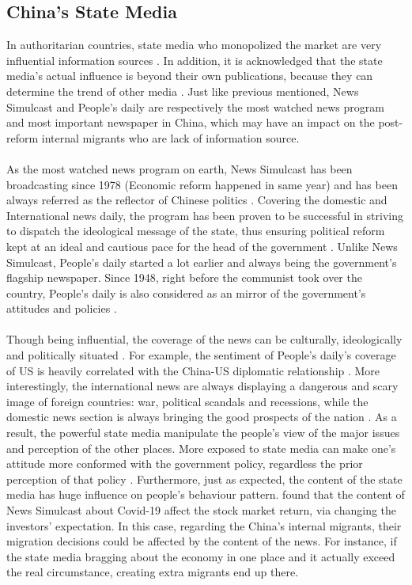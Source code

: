\documentclass{article}
\begin{document}
\subsection{China's State Media}
In authoritarian countries, state media who monopolized the market are very influential information sources \parencite{Becker:2004bl}. In addition, it is acknowledged that the state media's actual influence is beyond their own publications, because they can determine the trend of other media \parencite{Zhang:2022et}. Just like previous mentioned, News Simulcast and People's daily are respectively the most watched news program and most important newspaper in China, which may have an impact on the post-reform internal migrants who are lack of information source.
\\~\\
As the most watched news program on earth, News Simulcast has been broadcasting since 1978 (Economic reform happened in same year) and has been always referred as the reflector of Chinese politics \parencite{Edward:2007ei}. Covering the domestic and International news daily, the program has been proven to be successful in striving to dispatch the ideological message of the state, thus ensuring political reform kept at an ideal and cautious pace for the head of the government \parencite{Chang:2016tn}. Unlike News Simulcast, People's daily started a lot earlier and always being the government’s flagship newspaper. Since 1948, right before the communist took over the country, People's daily is also considered as an mirror of the government's attitudes and policies \parencite{Fish:2017fc}.
\\~\\
Though being influential, the coverage of the news can be culturally, ideologically and politically situated \parencite{Wang:1993wn}. For example, the sentiment of People's daily's coverage of US is heavily correlated with the China-US diplomatic relationship \parencite{Lee:1982ud}. More interestingly, the international news are always displaying a dangerous and scary image of foreign countries: war, political scandals and recessions, while the domestic news section is always bringing the good prospects of the nation \parencite{Xu:2019sd}. As a result, the powerful state media manipulate the people's view of the major issues and perception of the other places. More exposed to state media can make one's attitude more conformed with the government policy, regardless the prior perception of that policy \parencite{Pan:2022pt}. Furthermore, just as expected, the content of the state media has huge influence on people's behaviour pattern. \textcite{Zhang:2022et} found that the content of News Simulcast about Covid-19 affect the stock market return, via changing the investors' expectation. In this case, regarding the China's internal migrants, their migration decisions could be affected by the content of the news. For instance, if the state media bragging about the economy in one place and it actually exceed the real circumstance, creating extra migrants end up there.
\end{document}
